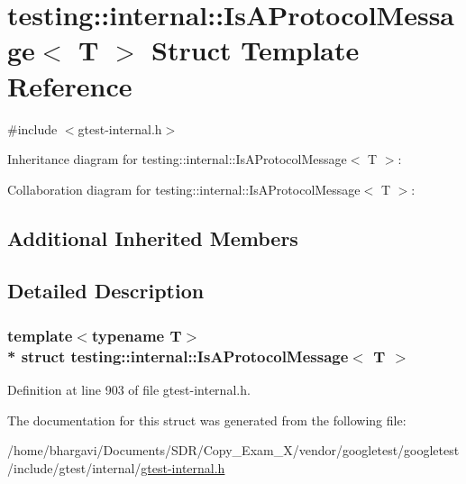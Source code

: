 \hypertarget{structtesting_1_1internal_1_1_is_a_protocol_message}{}\section{testing\+:\+:internal\+:\+:Is\+A\+Protocol\+Message$<$ T $>$ Struct Template Reference}
\label{structtesting_1_1internal_1_1_is_a_protocol_message}


{\ttfamily \#include $<$gtest-\/internal.\+h$>$}



Inheritance diagram for testing\+:\+:internal\+:\+:Is\+A\+Protocol\+Message$<$ T $>$\+:


Collaboration diagram for testing\+:\+:internal\+:\+:Is\+A\+Protocol\+Message$<$ T $>$\+:
\subsection*{Additional Inherited Members}


\subsection{Detailed Description}
\subsubsection*{template$<$typename T$>$\\*
struct testing\+::internal\+::\+Is\+A\+Protocol\+Message$<$ T $>$}



Definition at line 903 of file gtest-\/internal.\+h.



The documentation for this struct was generated from the following file\+:\begin{DoxyCompactItemize}
\item 
/home/bhargavi/\+Documents/\+S\+D\+R/\+Copy\+\_\+\+Exam\+\_\+X/vendor/googletest/googletest/include/gtest/internal/\hyperlink{gtest-internal_8h}{gtest-\/internal.\+h}\end{DoxyCompactItemize}
